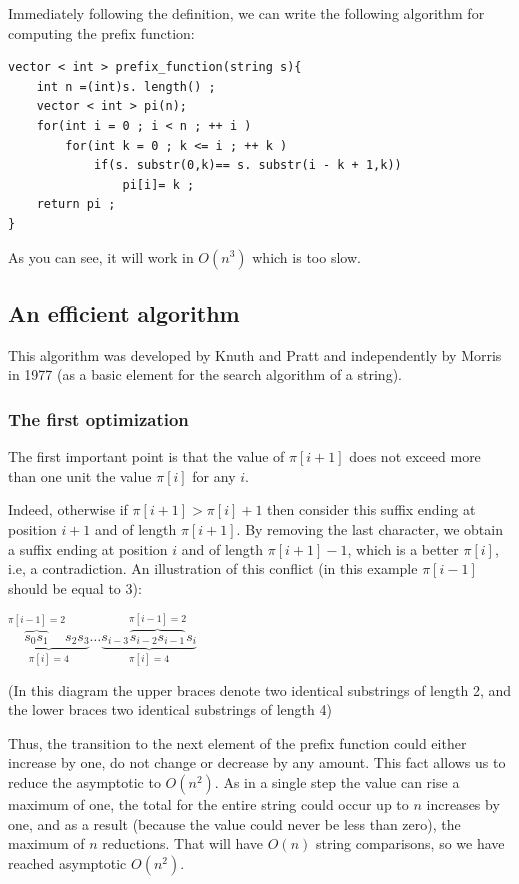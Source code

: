 Immediately following the definition, we can write the following algorithm for computing the prefix function:

\begin{verbatim}
vector < int > prefix_function(string s){
    int n =(int)s. length() ;
    vector < int > pi(n);
    for(int i = 0 ; i < n ; ++ i )
        for(int k = 0 ; k <= i ; ++ k )
            if(s. substr(0,k)== s. substr(i - k + 1,k))
                pi[i]= k ;
    return pi ;
} 
\end{verbatim}
As you can see, it will work in $O (n ^ 3)$ which is too slow.

\subsection{ An efficient algorithm }

This algorithm was developed by Knuth and Pratt and independently by Morris in 1977 (as a basic element for the search algorithm of a string).

\subsubsection{ The first optimization }

The first important point is that the value of $\pi [i +1]$ does not exceed more than one unit the value $\pi [i]$ for any $i$.

Indeed, otherwise if $\pi [i +1]> \pi [i] + 1$ then consider this suffix ending at position $i +1$ and of length $\pi [i +1]$. By removing the last character, we obtain a suffix ending at position $i$ and of length $\pi [i +1] -1$, which is a better $\pi [i]$, i.e, a contradiction. An illustration of this conflict (in this example $\pi [i-1]$ should be equal to 3):

$\underbrace {\overbrace {s_0 s_1} ^ {\pi [i-1] = 2} s_2 s_3} _ {\pi [i] = 4} \ldots    \underbrace{s_{i-3}\overbrace {s_{i-2} s_{i-1}} ^ {\pi [i-1] = 2} s_i}  _ {\pi [i] = 4}$

(In this diagram the upper braces denote two identical substrings of length 2, and the lower braces two identical substrings of length 4)

Thus, the transition to the next element of the prefix function could either increase by one, do not change or decrease by any amount. This fact allows us to reduce the asymptotic to $O (n ^ 2)$. As in a single step the value can rise a maximum of one, the total for the entire string could occur up to $n$ increases by one, and as a result (because the value could never be less than zero), the maximum of $n$ reductions. That will have $O (n)$ string comparisons, so we have reached asymptotic $O (n ^ 2)$.


